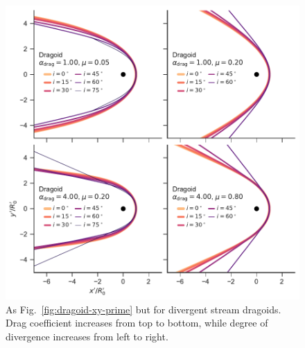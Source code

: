 \begin{figure}
  \centering
  \includegraphics[width=\linewidth]{figs/test_xyprime_div_dragoid}
  \caption{As Fig.~\ref{fig:dragoid-xy-prime} but for divergent stream
    dragoids.  Drag coefficient increases from top to bottom, while
    degree of divergence increases from left to right. }
  \label{fig:dragoid-div-xy-prime}
\end{figure}


